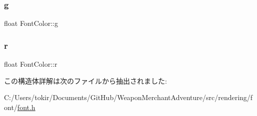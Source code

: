 \mbox{\label{struct_font_color_aee91e6024a40a2bc4a21cc427c9102a6}} 
\subsubsection{\texorpdfstring{g}{g}}
{\footnotesize\ttfamily float Font\+Color\+::g}

\mbox{\label{struct_font_color_a194c6908e2594b30387e7e127e340f87}} 
\subsubsection{\texorpdfstring{r}{r}}
{\footnotesize\ttfamily float Font\+Color\+::r}



この構造体詳解は次のファイルから抽出されました\+:\begin{DoxyCompactItemize}
\item 
C\+:/\+Users/tokir/\+Documents/\+Git\+Hub/\+Weapon\+Merchant\+Adventure/src/rendering/font/\mbox{\hyperlink{font_8h}{font.\+h}}\end{DoxyCompactItemize}
